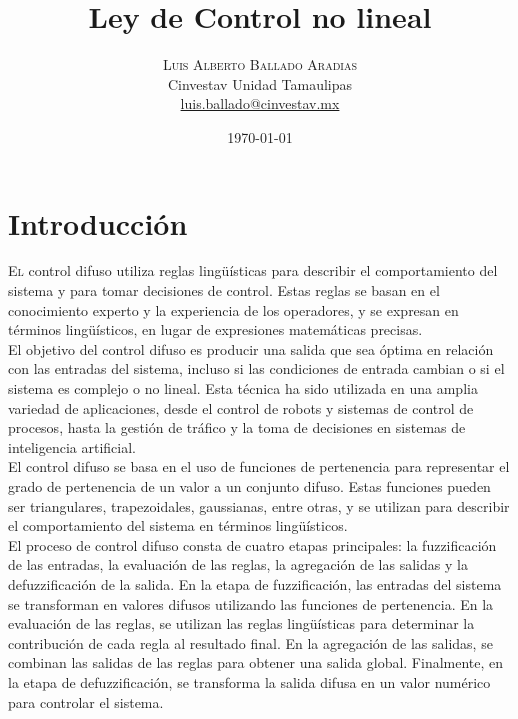 \documentclass[oneside,onecolumn]{article}
\title{Ley de Control no lineal} %
\author{%
\textsc{Luis Alberto Ballado Aradias} \\%
\normalsize Cinvestav Unidad Tamaulipas \\ %
\normalsize \href{mailto:luis.ballado@cinvestav.mx}{luis.ballado@cinvestav.mx} %
}
\date{\today} %
\begin{document}
\maketitle

\section{Introducción}

\lettrine[nindent=0em,lines=3]{E}l control difuso utiliza reglas lingüísticas para describir el comportamiento del sistema y para tomar decisiones de control. Estas reglas se basan en el conocimiento experto y la experiencia de los operadores, y se expresan en términos lingüísticos, en lugar de expresiones matemáticas precisas.\\

El objetivo del control difuso es producir una salida que sea óptima en relación con las entradas del sistema, incluso si las condiciones de entrada cambian o si el sistema es complejo o no lineal. Esta técnica ha sido utilizada en una amplia variedad de aplicaciones, desde el control de robots y sistemas de control de procesos, hasta la gestión de tráfico y la toma de decisiones en sistemas de inteligencia artificial.\\

El control difuso se basa en el uso de funciones de pertenencia para representar el grado de pertenencia de un valor a un conjunto difuso. Estas funciones pueden ser triangulares, trapezoidales, gaussianas, entre otras, y se utilizan para describir el comportamiento del sistema en términos lingüísticos.\\

El proceso de control difuso consta de cuatro etapas principales: la fuzzificación de las entradas, la evaluación de las reglas, la agregación de las salidas y la defuzzificación de la salida. En la etapa de fuzzificación, las entradas del sistema se transforman en valores difusos utilizando las funciones de pertenencia. En la evaluación de las reglas, se utilizan las reglas lingüísticas para determinar la contribución de cada regla al resultado final. En la agregación de las salidas, se combinan las salidas de las reglas para obtener una salida global. Finalmente, en la etapa de defuzzificación, se transforma la salida difusa en un valor numérico para controlar el sistema.\\
\end{document}

